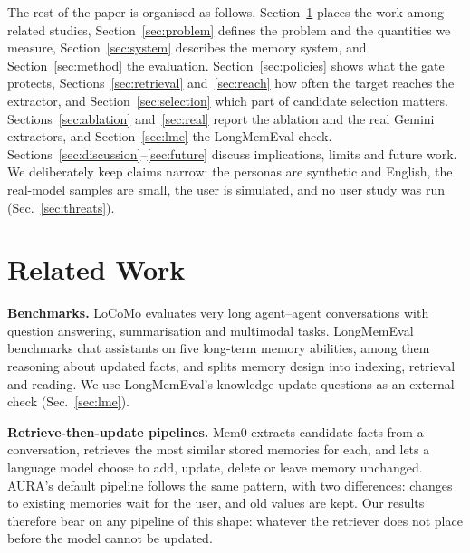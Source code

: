 \IfFileExists{IEEEtran.cls}{\documentclass[journal]{IEEEtran}\def\HAVEIEEE{1}}{\documentclass[10pt,twocolumn]{article}\usepackage[margin=0.7in,columnsep=0.25in]{geometry}}
\newcommand{\aura}{AURA}
\begin{document}
The rest of the paper is organised as follows. Section~\ref{sec:related} places the work among related studies, Section~\ref{sec:problem} defines the problem and the quantities we measure, Section~\ref{sec:system} describes the memory system, and Section~\ref{sec:method} the evaluation. Section~\ref{sec:policies} shows what the gate protects, Sections~\ref{sec:retrieval} and~\ref{sec:reach} how often the target reaches the extractor, and Section~\ref{sec:selection} which part of candidate selection matters. Sections~\ref{sec:ablation} and~\ref{sec:real} report the ablation and the real Gemini extractors, and Section~\ref{sec:lme} the LongMemEval check. Sections~\ref{sec:discussion}--\ref{sec:future} discuss implications, limits and future work. We deliberately keep claims narrow: the personas are synthetic and English, the real-model samples are small, the user is simulated, and no user study was run (Sec.~\ref{sec:threats}).

\section{Related Work}
\label{sec:related}
\textbf{Benchmarks.} LoCoMo \cite{maharana2024locomo} evaluates very long agent--agent conversations with question answering, summarisation and multimodal tasks. LongMemEval \cite{wu2024longmemeval} benchmarks chat assistants on five long-term memory abilities, among them reasoning about updated facts, and splits memory design into indexing, retrieval and reading. We use LongMemEval's knowledge-update questions as an external check (Sec.~\ref{sec:lme}).

\textbf{Retrieve-then-update pipelines.} Mem0 \cite{chhikara2025mem0} extracts candidate facts from a conversation, retrieves the most similar stored memories for each, and lets a language model choose to add, update, delete or leave memory unchanged. \aura's default pipeline follows the same pattern, with two differences: changes to existing memories wait for the user, and old values are kept. Our results therefore bear on any pipeline of this shape: whatever the retriever does not place before the model cannot be updated.
\end{document}
